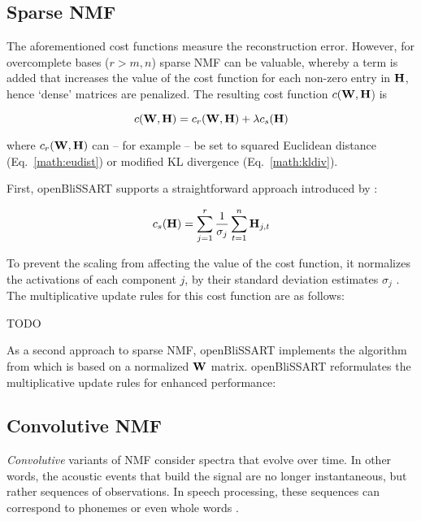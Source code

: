 \subsection{Sparse NMF}
\label{sec:sparseness}

The aforementioned cost functions measure the reconstruction error.
However, for overcomplete bases (\ie $r > m,n$) sparse NMF \cite{Hoyer2002,Hoyer2004,Eggert2004,Schmidt2006,Virtanen2007} can be valuable, whereby a term is added that increases the value of the cost function for each non-zero entry in
$\mathbf{H}$, hence `dense' matrices are penalized. The resulting cost function
$c(\mathbf{W},\mathbf{H}$) is

\begin{equation}
    \label{math:costsparseness}
    c(\mathbf{W},\mathbf{H}) = c_r(\mathbf{W},\mathbf{H}) + \lambda c_s(\mathbf{H})
\end{equation}

\noindent where $c_r(\mathbf{W},\mathbf{H})$ can -- for example -- be set to squared
Euclidean distance (Eq.~\ref{math:eudist}) or modified KL divergence
(Eq.~\ref{math:kldiv}).

First, openBliSSART supports a straightforward approach introduced by \cite{Virtanen2007}:

\begin{equation}
    \label{math:sparseness} 
    c_s(\mathbf{H}) = \sum\limits_{j=1}^r \frac{1}{\sigma_j} \sum\limits_{t=1}^n \mathbf{H}_{j,t}
\end{equation}

To prevent the scaling from affecting the value of the cost
function, it normalizes the activations of each component $j$, \eg
by their standard deviation estimates $\sigma_j$ \cite{Virtanen2007}. The multiplicative update rules for this cost function are as follows:

TODO

As a second approach to sparse NMF, openBliSSART implements the algorithm from \cite{Eggert2004} which is based on a normalized $\mathbf{W}$ matrix. openBliSSART reformulates the multiplicative update rules for enhanced performance:



\subsection{Convolutive NMF}

\label{sec:NMD}

\emph{Convolutive} variants of NMF 
consider spectra that evolve over time. In other words, the acoustic events
that build the signal are no longer instantaneous, but rather sequences of
observations. In speech processing, these sequences can correspond to phonemes
\cite{Smaragdis2007} or even whole words \cite{Smaragdis2004}. 

